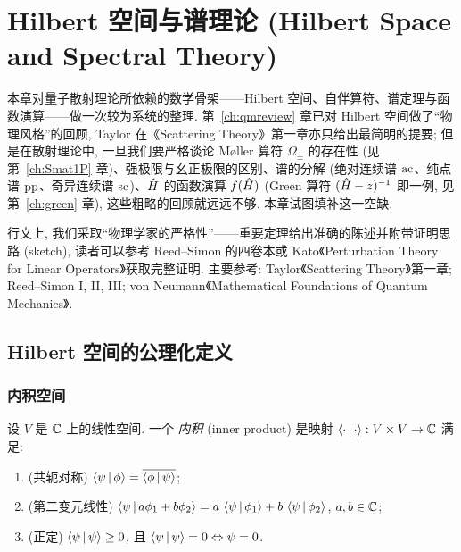 \chapter{Hilbert 空间与谱理论 (Hilbert Space and Spectral Theory)}\label{ch:hilbert}

\providecommand{\N}{\mathbb{N}}
\providecommand{\Ker}{\operatorname{Ker}}

本章对量子散射理论所依赖的数学骨架——Hilbert 空间、自伴算符、谱定理与函数演算——做一次较为系统的整理. 第~\ref{ch:qmreview} 章已对 Hilbert 空间做了``物理风格''的回顾, Taylor 在《Scattering Theory》第一章亦只给出最简明的提要; 但是在散射理论中, 一旦我们要严格谈论 Møller 算符 $\Omega_{\pm}$ 的存在性 (见第~\ref{ch:Smat1P} 章)、强极限与幺正极限的区别、谱的分解 (绝对连续谱 ${\rm ac}$、纯点谱 ${\rm pp}$、奇异连续谱 ${\rm sc}$)、$\hat{H}$ 的函数演算 $f(\hat{H})$ (Green 算符 $(\hat{H}-z)^{-1}$ 即一例, 见第~\ref{ch:green} 章), 这些粗略的回顾就远远不够. 本章试图填补这一空缺.

行文上, 我们采取``物理学家的严格性''——重要定理给出准确的陈述并附带证明思路 (sketch), 读者可以参考 Reed--Simon 的四卷本或 Kato《Perturbation Theory for Linear Operators》获取完整证明. 主要参考: Taylor《Scattering Theory》第一章; Reed--Simon I, II, III; von Neumann《Mathematical Foundations of Quantum Mechanics》.

\section{Hilbert 空间的公理化定义}\label{sec:hilbert-axioms}

\subsection{内积空间}

\begin{definition}\label{def:hilbert-inner}
设 $V$ 是 $\mathbb{C}$ 上的线性空间. 一个 \emph{内积} (inner product) 是映射 $\left\langle \cdot \,\middle|\, \cdot \right\rangle:V\times V\to \mathbb{C}$ 满足:
\begin{enumerate}
    \item (共轭对称) $\left\langle \psi \,\middle|\, \phi \right\rangle=\overline{\left\langle \phi \,\middle|\, \psi \right\rangle}$;
    \item (第二变元线性) $\left\langle \psi \,\middle|\, a\phi_1+b\phi_2 \right\rangle=a\,\left\langle \psi \,\middle|\, \phi_1 \right\rangle+b\,\left\langle \psi \,\middle|\, \phi_2 \right\rangle$, $a,b\in\mathbb{C}$;
    \item (正定) $\left\langle \psi \,\middle|\, \psi \right\rangle\geq 0$, 且 $\left\langle \psi \,\middle|\, \psi \right\rangle=0\Leftrightarrow\psi=0$.
\end{enumerate}
\end{definition}

